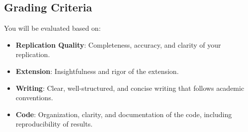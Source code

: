 \documentclass[
]{article}
\providecommand{\tightlist}{%
  \setlength{\itemsep}{0pt}\setlength{\parskip}{0pt}}
\begin{document}
\hypertarget{grading-criteria}{%
\subsection{Grading Criteria}\label{grading-criteria}}

You will be evaluated based on:

\begin{itemize}
\tightlist
\item
  \textbf{Replication Quality}: Completeness, accuracy, and clarity of your replication.
\item
  \textbf{Extension}: Insightfulness and rigor of the extension.
\item
  \textbf{Writing}: Clear, well-structured, and concise writing that follows academic conventions.
\item
  \textbf{Code}: Organization, clarity, and documentation of the code, including reproducibility of results.
\end{itemize}
\end{document}
